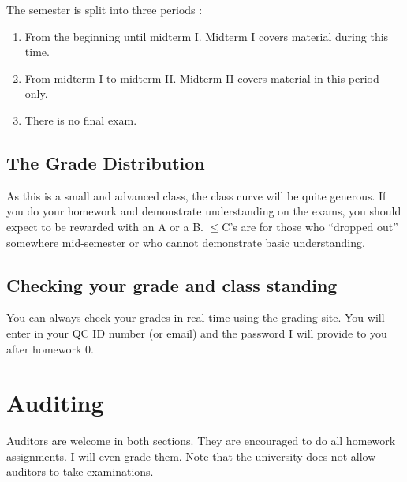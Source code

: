 \documentclass[12pt]{article}
\newcommand{\qu}[1]{``#1''}
\begin{document}
The semester is split into three periods :

\begin{enumerate}
\item From the beginning until midterm I. Midterm I covers material during this time.
\item From midterm I to midterm II. Midterm II covers material in this period only. 
\item There is no final exam.
\end{enumerate}


\subsection*{The Grade Distribution}

As this is a small and advanced class, the class curve will be quite generous. If you do your homework and demonstrate understanding on the exams, you should expect to be rewarded with an A or a B. $\leq$C's are for those who \qu{dropped out} somewhere mid-semester or who cannot demonstrate basic understanding.

\subsection*{Checking your grade and class standing}

You can always check your grades in real-time using the \href{http://gradesly.com}{grading site}. You will enter in your QC ID number (or email) and the password I will provide to you after homework 0.

\section*{Auditing}

Auditors are welcome in both sections. They are encouraged to do all homework assignments. I will even grade them. Note that the university does not allow auditors to take examinations.
\end{document}
